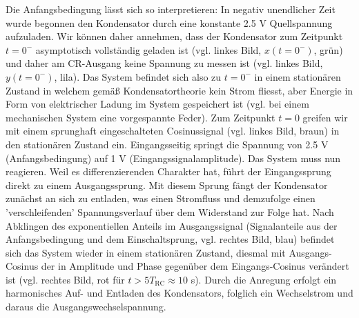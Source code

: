 \begin{Loesung}
Die Anfangsbedingung lässt sich so interpretieren: In negativ unendlicher Zeit wurde begonnen den Kondensator durch eine konstante 2.5 V Quellspannung aufzuladen. Wir können daher annehmen, dass der Kondensator zum Zeitpunkt $t=0^-$ asymptotisch vollständig geladen ist (vgl. linkes Bild, $x(t=0^-)$, grün) und daher am CR-Ausgang keine Spannung zu messen ist (vgl. linkes Bild, $y(t=0^-)$, lila). Das System befindet sich also zu $t=0^-$ in einem stationären Zustand in welchem gemäß Kondensatortheorie kein Strom fliesst, aber Energie in Form von elektrischer Ladung im System gespeichert ist (vgl. bei einem mechanischen System eine vorgespannte Feder). Zum Zeitpunkt $t=0$ greifen wir mit einem sprunghaft eingeschalteten Cosinussignal (vgl. linkes Bild, braun) in den stationären Zustand ein. Eingangsseitig springt die Spannung von 2.5 V (Anfangsbedingung) auf 1 V (Eingangssignalamplitude). Das System muss nun reagieren. Weil es differenzierenden Charakter hat, führt der Eingangssprung direkt zu einem Ausgangssprung. Mit diesem Sprung fängt der Kondensator zunächst an sich zu entladen, was einen Stromfluss und demzufolge einen 'verschleifenden' Spannungsverlauf über dem Widerstand zur Folge hat. Nach Abklingen des exponentiellen Anteils im Ausgangssignal (Signalanteile aus der Anfangsbedingung und dem Einschaltsprung, vgl. rechtes Bild, blau) befindet sich das System wieder in einem stationären Zustand, diesmal mit Ausgangs-Cosinus der in Amplitude und Phase gegenüber dem Eingangs-Cosinus verändert ist (vgl. rechtes Bild, rot für $t > 5 T_\text{RC} \approx 10$ s). Durch die Anregung erfolgt ein harmonisches Auf- und Entladen des Kondensators, folglich ein Wechselstrom und daraus die Ausgangswechselspannung.
\end{Loesung}
%




\newpage
